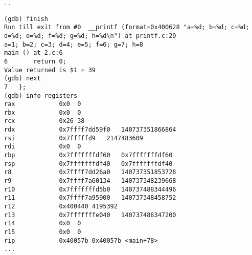 .
\RIP {} 
.

\begin{lstlisting}
(gdb) finish
Run till exit from #0  __printf (format=0x400628 "a=%d; b=%d; c=%d; d=%d; e=%d; f=%d; g=%d; h=%d\n") at printf.c:29
a=1; b=2; c=3; d=4; e=5; f=6; g=7; h=8
main () at 2.c:6
6		return 0;
Value returned is $1 = 39
(gdb) next
7	};
(gdb) info registers
rax            0x0	0
rbx            0x0	0
rcx            0x26	38
rdx            0x7ffff7dd59f0	140737351866864
rsi            0x7fffffd9	2147483609
rdi            0x0	0
rbp            0x7fffffffdf60	0x7fffffffdf60
rsp            0x7fffffffdf40	0x7fffffffdf40
r8             0x7ffff7dd26a0	140737351853728
r9             0x7ffff7a60134	140737348239668
r10            0x7fffffffd5b0	140737488344496
r11            0x7ffff7a95900	140737348458752
r12            0x400440	4195392
r13            0x7fffffffe040	140737488347200
r14            0x0	0
r15            0x0	0
rip            0x40057b	0x40057b <main+78>
...
\end{lstlisting}
\fi
\fi
